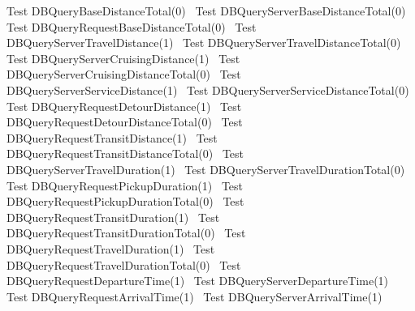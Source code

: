 \documentclass{article}
\def\nwendcode{\endtrivlist \endgroup}
\let\nwdocspar=\par
\begin{document}
\LA{}Test \code{}DBQueryBaseDistanceTotal\edoc{}(0)~{\nwtagstyle{}}\RA{}
\LA{}Test \code{}DBQueryServerBaseDistanceTotal\edoc{}(0)~{\nwtagstyle{}}\RA{}
\LA{}Test \code{}DBQueryRequestBaseDistanceTotal\edoc{}(0)~{\nwtagstyle{}}\RA{}
\LA{}Test \code{}DBQueryServerTravelDistance\edoc{}(1)~{\nwtagstyle{}}\RA{}
\LA{}Test \code{}DBQueryServerTravelDistanceTotal\edoc{}(0)~{\nwtagstyle{}}\RA{}
\LA{}Test \code{}DBQueryServerCruisingDistance\edoc{}(1)~{\nwtagstyle{}}\RA{}
\LA{}Test \code{}DBQueryServerCruisingDistanceTotal\edoc{}(0)~{\nwtagstyle{}}\RA{}
\LA{}Test \code{}DBQueryServerServiceDistance\edoc{}(1)~{\nwtagstyle{}}\RA{}
\LA{}Test \code{}DBQueryServerServiceDistanceTotal\edoc{}(0)~{\nwtagstyle{}}\RA{}
\LA{}Test \code{}DBQueryRequestDetourDistance\edoc{}(1)~{\nwtagstyle{}}\RA{}
\LA{}Test \code{}DBQueryRequestDetourDistanceTotal\edoc{}(0)~{\nwtagstyle{}}\RA{}
\LA{}Test \code{}DBQueryRequestTransitDistance\edoc{}(1)~{\nwtagstyle{}}\RA{}
\LA{}Test \code{}DBQueryRequestTransitDistanceTotal\edoc{}(0)~{\nwtagstyle{}}\RA{}
\LA{}Test \code{}DBQueryServerTravelDuration\edoc{}(1)~{\nwtagstyle{}}\RA{}
\LA{}Test \code{}DBQueryServerTravelDurationTotal\edoc{}(0)~{\nwtagstyle{}}\RA{}
\LA{}Test \code{}DBQueryRequestPickupDuration\edoc{}(1)~{\nwtagstyle{}}\RA{}
\LA{}Test \code{}DBQueryRequestPickupDurationTotal\edoc{}(0)~{\nwtagstyle{}}\RA{}
\LA{}Test \code{}DBQueryRequestTransitDuration\edoc{}(1)~{\nwtagstyle{}}\RA{}
\LA{}Test \code{}DBQueryRequestTransitDurationTotal\edoc{}(0)~{\nwtagstyle{}}\RA{}
\LA{}Test \code{}DBQueryRequestTravelDuration\edoc{}(1)~{\nwtagstyle{}}\RA{}
\LA{}Test \code{}DBQueryRequestTravelDurationTotal\edoc{}(0)~{\nwtagstyle{}}\RA{}
\LA{}Test \code{}DBQueryRequestDepartureTime\edoc{}(1)~{\nwtagstyle{}}\RA{}
\LA{}Test \code{}DBQueryServerDepartureTime\edoc{}(1)~{\nwtagstyle{}}\RA{}
\LA{}Test \code{}DBQueryRequestArrivalTime\edoc{}(1)~{\nwtagstyle{}}\RA{}
\LA{}Test \code{}DBQueryServerArrivalTime\edoc{}(1)~{\nwtagstyle{}}\RA{}
\nwendcode{}\nwdocspar
\end{document}
